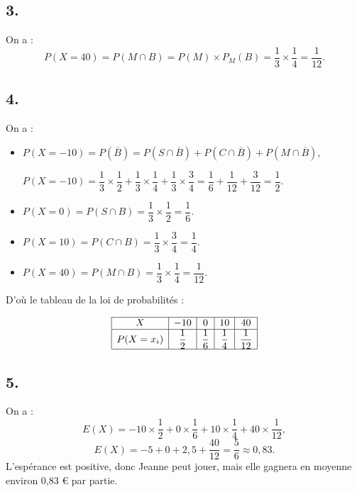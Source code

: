 \documentclass[10pt]{article}
\begin{document}
\subsection*{3.}

On a :
\[
P(X = 40) = P(M \cap B) = P(M) \times P_M(B) = \dfrac{1}{3} \times \dfrac{1}{4} = \dfrac{1}{12}.
\]

\subsection*{4.}

On a :
\begin{itemize}
    \item
    \(P(X = -10) = P(\overline{B}) = P(S \cap \overline{B}) + P(C \cap \overline{B}) + P(M \cap \overline{B})\),

\(P(X = -10) = \dfrac{1}{3} \times \dfrac{1}{2} + \dfrac{1}{3} \times \dfrac{1}{4} + \dfrac{1}{3} \times \dfrac{3}{4} = \dfrac{1}{6} + \dfrac{1}{12} + \dfrac{3}{12} = \dfrac{1}{2}\).
    \item \(P(X = 0) = P(S \cap B) = \dfrac{1}{3} \times \dfrac{1}{2} = \dfrac{1}{6}\).
    \item \(P(X = 10) = P(C \cap B) = \dfrac{1}{3} \times \dfrac{3}{4} = \dfrac{1}{4}\).
    \item \(P(X = 40) = P(M \cap B) = \dfrac{1}{3} \times \dfrac{1}{4} = \dfrac{1}{12}\).
\end{itemize}

D'où le tableau de la loi de probabilités :

\[
\begin{array}{|c|c|c|c|c|}
\hline
X & -10 & 0 & 10 & 40 \\
\hline
P(X = x_i) & \dfrac{1}{2} & \dfrac{1}{6} & \dfrac{1}{4} & \dfrac{1}{12} \\
\hline
\end{array}
\]

\subsection*{5.}

On a :
\[
E(X) = -10 \times \dfrac{1}{2} + 0 \times \dfrac{1}{6} + 10 \times \dfrac{1}{4} + 40 \times \dfrac{1}{12},
\]
\[
E(X) = -5 + 0 + 2,5 + \dfrac{40}{12} = \dfrac{5}{6} \approx 0,83.
\]
L'espérance est positive, donc Jeanne peut jouer, mais elle gagnera en moyenne environ 0,83 € par partie.
\end{document}
